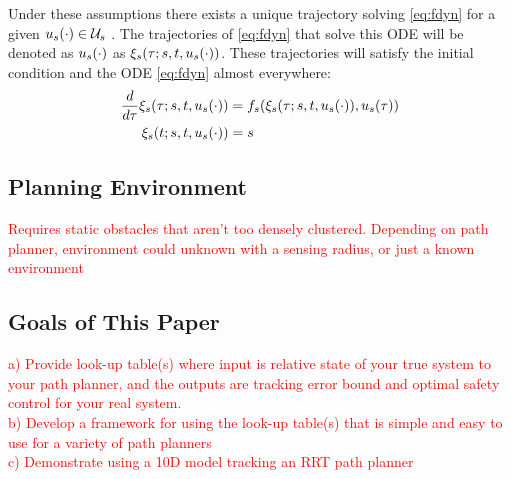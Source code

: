 Under these assumptions there exists a unique trajectory solving \ref{eq:fdyn} for a given $u_s(\cdot) \in \mathcal{U}_s$ \cite{Coddington84}. The trajectories of \ref{eq:fdyn} that solve this ODE will be denoted as $u_s(\cdot)$ as $\xi_{s}(\tau; s, t, u_s(\cdot))$. These trajectories will satisfy the initial condition and the ODE \ref{eq:fdyn} almost everywhere:
\begin{equation}
\label{eq:fdyn_traj}
\begin{aligned}
\frac{d}{d\tau}\xi_{s}(\tau; s, t, u_s(\cdot)) &= f_s(\xi_{s}(\tau; s, t, u_s(\cdot)), u_s(\tau)) \\
\xi_{s}(t; s, t, u_s(\cdot)) &= s
\end{aligned}
\end{equation}


\subsection{Planning Environment}
\textcolor{red}{Requires static obstacles that aren't too densely clustered. Depending on path planner, environment could unknown with a sensing radius, or just a known environment}

\subsection{Goals of This Paper}
\textcolor{red}{
	a) Provide look-up table(s) where input is relative state of your true system to your path planner, and the outputs are tracking error bound and optimal safety control for your real system.\\
	b) Develop a framework for using the look-up table(s) that is simple and easy to use for a variety of path planners\\
	c) Demonstrate using a 10D model tracking an RRT path planner}